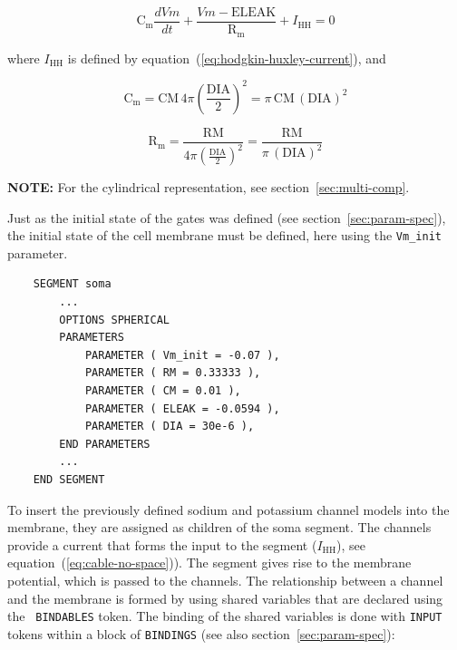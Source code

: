 \documentclass[12pt]{article}
\begin{document}
\begin{equation}
  \label{eq:cable-no-space}
  \mathrm{C_m} \frac{dVm}{dt} + \frac{Vm - \mathrm{ELEAK}}{\mathrm{R_m}} + I_{\mathrm{HH}} = 0
\end{equation}

where $I_{\mathrm{HH}}$ is defined by
equation~(\ref{eq:hodgkin-huxley-current}), and

\begin{equation}
  \label{eq:cable-no-space-cm}
  \mathrm{C_m} = \mathrm{CM} \, 4 \pi \left( \frac{\mathrm{DIA}}{2} \right) ^2 = \pi \, \mathrm{CM} \, (\mathrm{DIA}) ^2
\end{equation}

\begin{equation}
  \label{eq:cable-no-space-rm}
  \mathrm{R_m} = \frac{\mathrm{RM}}{4 \pi \left( \frac{\mathrm{DIA}}{2} \right) ^2} = \frac{\mathrm{RM}}{\pi \, (\mathrm{DIA}) ^2}
\end{equation}

{\bf NOTE:} For the cylindrical representation, see section~\ref{sec:multi-comp}.

Just as the initial state of the gates was defined (see
section~\ref{sec:param-spec}), the initial state of the cell membrane
must be defined, here using the {\tt Vm\_init} parameter.

\begin{verbatim}
    SEGMENT soma
        ...
        OPTIONS SPHERICAL
        PARAMETERS
            PARAMETER ( Vm_init = -0.07 ),
            PARAMETER ( RM = 0.33333 ),
            PARAMETER ( CM = 0.01 ),
            PARAMETER ( ELEAK = -0.0594 ),
            PARAMETER ( DIA = 30e-6 ),
        END PARAMETERS
        ...
    END SEGMENT
\end{verbatim}

To insert the previously defined sodium and potassium channel models
into the membrane, they are assigned as children of the soma segment.
The channels provide a current that forms the input to the segment
($I_{\mathrm{HH}}$), see equation~(\ref{eq:cable-no-space})).  The
segment gives rise to the membrane potential, which is passed to the
channels.  The relationship between a channel and the membrane is
formed by using shared variables that are declared using the {\tt
  BINDABLES} token.  The binding of the shared variables is done with
{\tt INPUT} tokens within a block of {\tt BINDINGS} (see also
section~\ref{sec:param-spec}):
\end{document}
